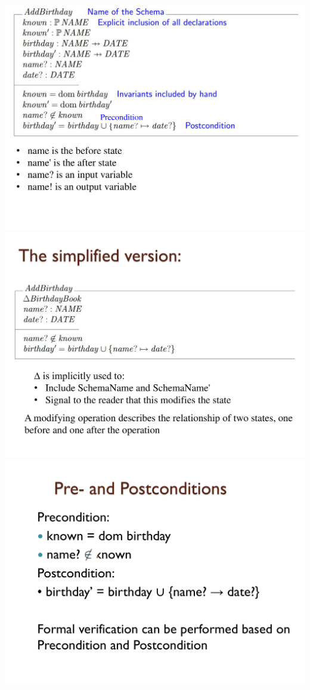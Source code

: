 \documentclass[a4paper]{article}
\begin{document}
\begin{multicols}{3}
        \includegraphics[width=\linewidth]{459.pdf}\\
        \includegraphics[width=\linewidth]{460.pdf}\\
        \includegraphics[width=\linewidth]{461.pdf}\\
    \end{multicols}
    
\end{document}
